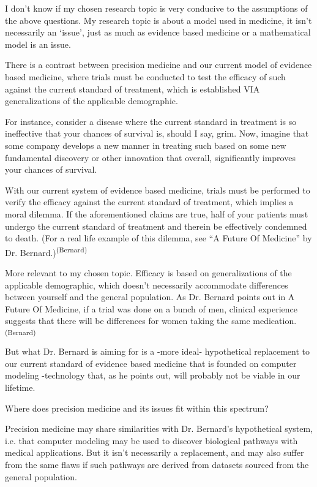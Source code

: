 I don’t know if my chosen research topic is very conducive to the assumptions of the above questions. My research topic is about a model used in medicine, it isn’t necessarily an ‘issue’, just as much as evidence based medicine or a mathematical model is an issue.

There is a contrast between precision medicine and our current model of evidence based medicine, where trials must be conducted to test the efficacy of such against the current standard of treatment, which is established VIA generalizations of the applicable demographic.

For instance, consider a disease where the current standard in treatment is so ineffective that your chances of survival is, should I say, grim. Now, imagine that some company develops a new manner in treating such based on some new fundamental discovery or other innovation that overall, significantly improves your chances of survival. 

With our current system of evidence based medicine, trials must be performed to verify the efficacy against the current standard of treatment, which implies a moral dilemma. If the aforementioned claims are true, half of your patients must undergo the current standard of treatment and therein be effectively condemned to death. (For a real life example of this dilemma, see “A Future Of Medicine” by Dr. Bernard.)\textsuperscript{(Bernard)}

More relevant to my chosen topic. Efficacy is based on generalizations of the applicable demographic, which doesn’t necessarily accommodate differences between yourself and the general population. As Dr. Bernard points out in A Future Of Medicine, if a trial was done on a bunch of men, clinical experience suggests that there will be differences for women taking the same medication.\textsuperscript{(Bernard)}

But what Dr. Bernard is aiming for is a -more ideal- hypothetical replacement to our current standard of evidence based medicine that is founded on computer modeling -technology that, as he points out, will probably not be viable in our lifetime.

Where does precision medicine and its issues fit within this spectrum?

Precision medicine may share similarities with Dr. Bernard’s hypothetical system, i.e. that computer modeling may be used to discover biological pathways with medical applications. But it isn’t necessarily a replacement, and may also suffer from the same flaws if such pathways are derived from datasets sourced from the general population. 

